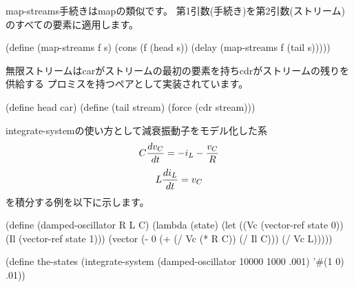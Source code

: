 {\cf map-streams}手続きは{\cf map}の類似です。
第1引数(手続き)を第2引数(ストリーム)のすべての要素に適用します。

\begin{schemenoindent}
(define (map-streams f s)
  (cons (f (head s))
        (delay (map-streams f (tail s)))))%
\end{schemenoindent}

無限ストリームはcarがストリームの最初の要素を持ちcdrがストリームの残りを供給する
プロミスを持つペアとして実装されています。

\begin{schemenoindent}
(define head car)
(define (tail stream)
  (force (cdr stream)))%
\end{schemenoindent}

\bigskip
{\cf integrate-system}の使い方として減衰振動子をモデル化した系
$$ C {dv_C \over dt} = -i_L - {v_C \over R}$$\nobreak
$$ L {di_L \over dt} = v_C$$
を積分する例を以下に示します。

\begin{schemenoindent}
(define (damped-oscillator R L C)
  (lambda (state)
    (let ((Vc (vector-ref state 0))
          (Il (vector-ref state 1)))
      (vector (- 0 (+ (/ Vc (* R C)) (/ Il C)))
              (/ Vc L)))))

(define the-states
  (integrate-system
     (damped-oscillator 10000 1000 .001)
     '\#(1 0)
     .01))%
\end{schemenoindent}

